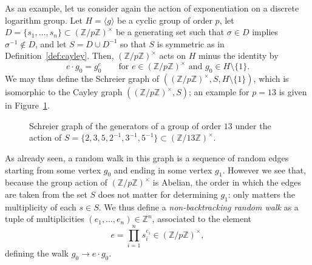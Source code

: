 \documentclass[10pt]{article}
\theoremstyle{plain}
\theoremstyle{definition}
\begin{document}
As an example, let us consider again the action of exponentiation on a
discrete logarithm group. %
Let $H=〈g〉$ be a cyclic group of order $p$, let
$D=\{s_1,\dots,s_n\}⊂(ℤ/pℤ)^{×}$ be a generating set such that $σ∈D$
implies $σ^{-1}∉D$, and let $S = D∪D^{-1}$ so that $S$ is symmetric as
in Definition~\ref{def:cayley}. %
Then, $(ℤ/pℤ)^{×}$ acts on  $H$ minus the identity by
\[e·g_0 = g_0^e\qquad\text{for $e∈(ℤ/pℤ)^×$ and
    $g_0∈H\setminus\{1\}$}.\] %
We may thus define the Schreier graph of
$((ℤ/pℤ)^{×}, S, H\setminus\{1\})$, which is isomorphic to the Cayley
graph $((ℤ/pℤ)^×,S)$; an example for $p=13$ is given in
Figure~\ref{fig:schreier}.


\begin{figure}
  \centering
  \caption{Schreier graph of the generators of a group of order $13$
    under the action of
    $S=\{2,3,5,2^{-1},3^{-1},5^{-1}\}⊂(ℤ/13ℤ)^{×}$.}
  \label{fig:schreier}
\end{figure}

As already seen, a random walk in this graph is a sequence of random
edges starting from some vertex $g_0$ and ending in some vertex
$g_1$. %
However we see that, because the group action of $(ℤ/pℤ)^×$ is
Abelian, the order in which the edges are taken from the set $S$ does
not matter for determining $g_1$: only matters the multiplicity of
each $s∈S$. %
We thus define a \emph{non-backtracking random walk} as a tuple of
multiplicities $(e_1,\dots,e_n)∈ℤ^n$, associated to the element
\[e = \prod_{i=1}^n s_i^{e_i} ∈ (ℤ/pℤ)^×,\]
defining the walk $g_0→e·g_0$. %
\end{document}
